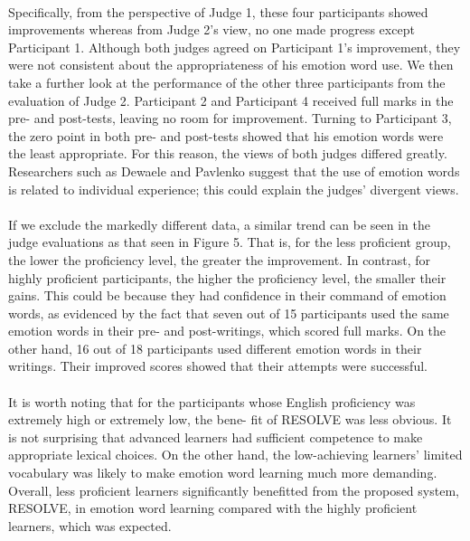 \documentclass[a4paper,12pt,oneside]{article}
\begin{document}
\paragraph{}
Specifically, from the perspective of Judge 1, these four participants showed improvements whereas from Judge 2’s view, no one made progress except Participant 1. Although both judges agreed on Participant 1’s improvement, they were not consistent about the appropriateness of his emotion word use. We then take a further look at the performance of the other three participants from the evaluation of Judge 2. Participant 2 and Participant 4 received full marks in the pre- and post-tests, leaving no room for improvement. Turning to Participant 3, the zero point in both pre- and post-tests showed that his emotion words were the least appropriate. For this reason, the views of both judges differed greatly. Researchers such as Dewaele and Pavlenko suggest that the use of emotion words is related to individual experience; this could explain the judges’ divergent views. 
\paragraph{}
If we exclude the markedly different data, a similar trend can be seen in the judge evaluations as that seen in Figure 5. That is, for the less proficient group, the lower the proficiency level, the greater the improvement. In contrast, for highly proficient participants, the higher the proficiency level, the smaller their gains. This could be because they had confidence in their command of emotion words, as evidenced by the fact that seven out of 15 participants used the same emotion words in their pre- and post-writings, which scored full marks. On the other hand, 16 out of 18 participants used different emotion words in their writings. Their improved scores showed that their attempts were successful. 
\paragraph{}
It is worth noting that for the participants whose English proficiency was extremely high or extremely low, the bene- fit of RESOLVE was less obvious. It is not surprising that advanced learners had sufficient competence to make appropriate lexical choices. On the other hand, the low-achieving learners’ limited vocabulary was likely to make emotion word learning much more demanding. Overall, less proficient learners significantly benefitted from the proposed system, RESOLVE, in emotion word learning compared with the highly proficient learners, which was expected. 
\end{document}
